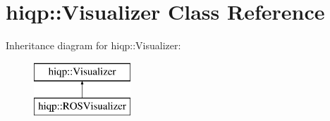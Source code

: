 \hypertarget{classhiqp_1_1Visualizer}{\section{hiqp\-:\-:Visualizer Class Reference}
\label{classhiqp_1_1Visualizer}
}
Inheritance diagram for hiqp\-:\-:Visualizer\-:\begin{figure}[H]
\begin{center}
\leavevmode
\includegraphics[height=2.000000cm]{classhiqp_1_1Visualizer}
\end{center}
\end{figure}
